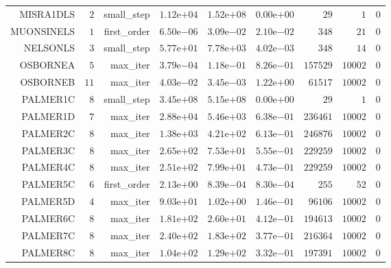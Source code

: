 \begin{longtable}{rrrrrrrrr}
MISRA1DLS & \(     2\) & small\_step & \( 1.12\)e\(+04\) & \( 1.52\)e\(+08\) & \( 0.00\)e\(+00\) & \(    29\) & \(     1\) & \(     0\) \\
MUONSINELS & \(     1\) & first\_order & \( 6.50\)e\(-06\) & \( 3.09\)e\(-02\) & \( 2.10\)e\(-02\) & \(   348\) & \(    21\) & \(     0\) \\
NELSONLS & \(     3\) & small\_step & \( 5.77\)e\(+01\) & \( 7.78\)e\(+03\) & \( 4.02\)e\(-03\) & \(   348\) & \(    14\) & \(     0\) \\
OSBORNEA & \(     5\) & max\_iter & \( 3.79\)e\(-04\) & \( 1.18\)e\(-01\) & \( 8.26\)e\(-01\) & \(157529\) & \( 10002\) & \(     0\) \\
OSBORNEB & \(    11\) & max\_iter & \( 4.03\)e\(-02\) & \( 3.45\)e\(-03\) & \( 1.22\)e\(+00\) & \( 61517\) & \( 10002\) & \(     0\) \\
PALMER1C & \(     8\) & small\_step & \( 3.45\)e\(+08\) & \( 5.15\)e\(+08\) & \( 0.00\)e\(+00\) & \(    29\) & \(     1\) & \(     0\) \\
PALMER1D & \(     7\) & max\_iter & \( 2.88\)e\(+04\) & \( 5.46\)e\(+03\) & \( 6.38\)e\(-01\) & \(236461\) & \( 10002\) & \(     0\) \\
PALMER2C & \(     8\) & max\_iter & \( 1.38\)e\(+03\) & \( 4.21\)e\(+02\) & \( 6.13\)e\(-01\) & \(246876\) & \( 10002\) & \(     0\) \\
PALMER3C & \(     8\) & max\_iter & \( 2.65\)e\(+02\) & \( 7.53\)e\(+01\) & \( 5.55\)e\(-01\) & \(229259\) & \( 10002\) & \(     0\) \\
PALMER4C & \(     8\) & max\_iter & \( 2.51\)e\(+02\) & \( 7.99\)e\(+01\) & \( 4.73\)e\(-01\) & \(229259\) & \( 10002\) & \(     0\) \\
PALMER5C & \(     6\) & first\_order & \( 2.13\)e\(+00\) & \( 8.39\)e\(-04\) & \( 8.30\)e\(-04\) & \(   255\) & \(    52\) & \(     0\) \\
PALMER5D & \(     4\) & max\_iter & \( 9.03\)e\(+01\) & \( 1.02\)e\(+00\) & \( 1.46\)e\(-01\) & \( 96106\) & \( 10002\) & \(     0\) \\
PALMER6C & \(     8\) & max\_iter & \( 1.81\)e\(+02\) & \( 2.60\)e\(+01\) & \( 4.12\)e\(-01\) & \(194613\) & \( 10002\) & \(     0\) \\
PALMER7C & \(     8\) & max\_iter & \( 2.40\)e\(+02\) & \( 1.83\)e\(+02\) & \( 3.77\)e\(-01\) & \(216364\) & \( 10002\) & \(     0\) \\
PALMER8C & \(     8\) & max\_iter & \( 1.04\)e\(+02\) & \( 1.29\)e\(+02\) & \( 3.32\)e\(-01\) & \(197391\) & \( 10002\) & \(     0\) \\

\end{longtable}
